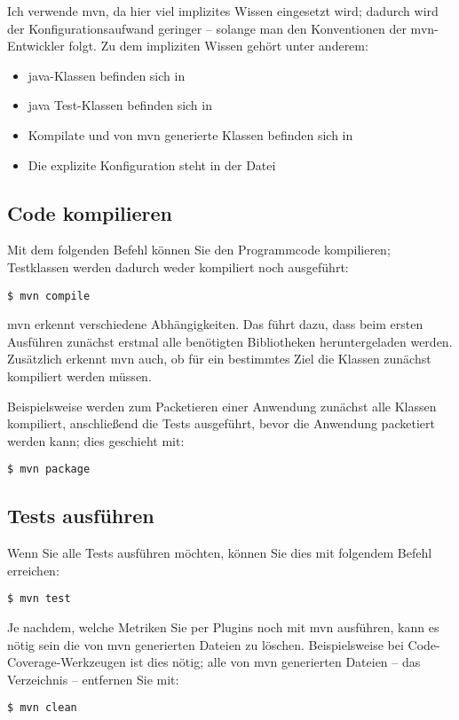 Ich verwende \gls{mvn}, da hier viel implizites Wissen eingesetzt wird; dadurch wird der Konfigurationsaufwand geringer -- solange man den Konventionen der \gls{mvn}-Entwickler folgt. Zu dem impliziten Wissen gehört unter anderem:
\begin{itemize}
\item \gls{java}-Klassen befinden sich in 
\item \gls{java} Test-Klassen befinden sich in 
\item Kompilate und von \gls{mvn} generierte Klassen befinden sich in 
\item Die explizite Konfiguration steht in der Datei 
\end{itemize}

\subsection{Code kompilieren}
Mit dem folgenden Befehl können Sie den Programmcode kompilieren; Testklassen werden dadurch weder kompiliert noch ausgeführt:
\begin{verbatim}
$ mvn compile
\end{verbatim}

\gls{mvn} erkennt verschiedene Abhängigkeiten. Das führt dazu, dass beim ersten Ausführen zunächst erstmal alle benötigten Bibliotheken heruntergeladen werden. Zusätzlich erkennt \gls{mvn} auch, ob für ein bestimmtes Ziel die Klassen zunächst kompiliert werden müssen.

Beispielsweise werden zum Packetieren einer Anwendung zunächst alle Klassen kompiliert, anschließend die Tests ausgeführt, bevor die Anwendung packetiert werden kann; dies geschieht mit:
\begin{verbatim}
$ mvn package
\end{verbatim}

\subsection{Tests ausführen}
Wenn Sie alle Tests ausführen möchten, können Sie dies mit folgendem Befehl erreichen:
\begin{verbatim}
$ mvn test
\end{verbatim}

Je nachdem, welche Metriken Sie per Plugins noch mit \gls{mvn} ausführen, kann es nötig sein die von \gls{mvn} generierten Dateien zu löschen. Beispielsweise bei Code-Coverage-Werkzeugen ist dies nötig; alle von \gls{mvn} generierten Dateien -- das Verzeichnis  -- entfernen Sie mit:
\begin{verbatim}
$ mvn clean
\end{verbatim}

